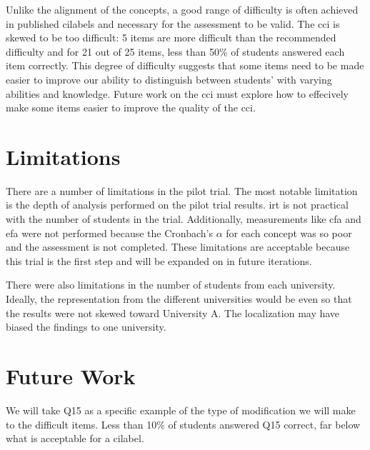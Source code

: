 
Unlike the alignment of the concepts, a good range of difficulty is often achieved in published \glspl{cilabel} and necessary for the assessment to be valid. The \gls{cci} is skewed to be too difficult: 5 items are more difficult than the recommended difficulty and for 21 out of 25 items, less than 50\% of students answered each item correctly. This degree of difficulty suggests that some items need to be made easier to improve our ability to distinguish between students' with varying abilities and knowledge. Future work on the \gls{cci} must explore how to effecively make some items easier to improve the quality of the \gls{cci}. 


\section{Limitations}

There are a number of limitations in the pilot trial. The most notable limitation is the depth of analysis performed on the pilot trial results. \gls{irt} is not practical with the number of students in the trial. Additionally, measurements like \gls{cfa} and \gls{efa} were not performed because the Cronbach's $\alpha$ for each concept was so poor and the assessment is not completed. These limitations are acceptable because this trial is the first step and will be expanded on in future iterations.

There were also limitations in the number of students from each university. Ideally, the representation from the different universities would be even so that the results were not skewed toward University A. The localization may have biased the findings to one university.

\section{Future Work}

We will take Q15 as a specific example of the type of modification we will make to the difficult items. Less than 10\% of students answered Q15 correct, far below what is acceptable for a \gls{cilabel}. 

